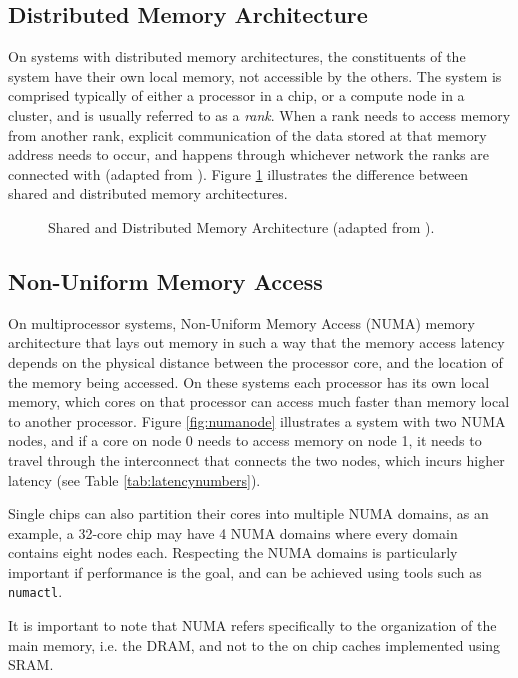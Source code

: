 \subsection{Distributed Memory Architecture}
\label{sec:distributedmemory}
On systems with distributed memory architectures, the constituents of the system have their own local memory, not accessible by the others. The system is comprised typically of either a processor in a chip, or a compute node in a cluster, and is usually referred to as a \textit{rank}.  When a rank needs to access memory from another rank, explicit communication of the data stored at that memory address needs to occur, and happens through whichever network the ranks are connected with (adapted from \cite{manchanda2010non}). Figure \ref{fig:sharedmemory} illustrates the difference between shared and distributed memory architectures.
\medskip


\begin{figure}[H]
    \centering
    \caption{Shared and Distributed Memory Architecture (adapted from \cite{llnlparallel}).}
    \label{fig:sharedmemory}
\end{figure}

\subsection{Non-Uniform Memory Access}
On multiprocessor systems, Non-Uniform Memory Access (NUMA) memory architecture that lays out memory in such a way that the memory access latency depends on the physical distance between the processor core, and the location of the memory being accessed. On these systems each processor has its own local memory, which cores on that processor can access much faster than memory local to another processor. Figure \ref{fig:numanode} illustrates a system with two NUMA nodes, and if a core on node 0 needs to access memory on node 1, it needs to travel through the interconnect that connects the two nodes, which incurs higher latency (see Table \ref{tab:latencynumbers}).
\medskip

Single chips can also partition their cores into multiple NUMA domains, as an example, a 32-core chip may have 4 NUMA domains where every domain contains eight nodes each. Respecting the NUMA domains is particularly important if performance is the goal, and can be achieved using tools such as \texttt{numactl}.
\medskip

It is important to note that NUMA refers specifically to the organization of the main memory, i.e. the DRAM, and not to the on chip caches implemented using SRAM.

